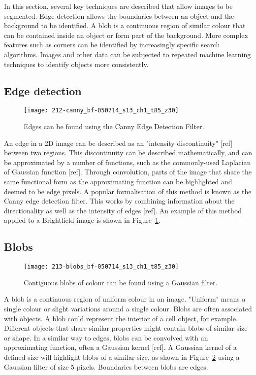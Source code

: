 In this section, several key techniques are described that allow images to be segmented. Edge detection allows the boundaries between an object and the background to be identified. A blob is a continuous region of similar colour that can be contained inside an object or form part of the background. More complex features such as corners can be identified by increasingly specific search algorithms. Images and other data can be subjected to repeated machine learning techniques to identify objects more consistently.

\subsection{Edge detection}

\begin{figure}[htbp!]
\centering
\texttt{[image: 212-canny\_bf-050714\_s13\_ch1\_t85\_z30]}
\caption[The canny filter]{Edges can be found using the Canny Edge Detection Filter.}
\label{fig:canny_filter_bf}
\end{figure}

An edge in a 2D image can be described as an "intensity discontinuity" [ref] between two regions. This discontinuity can be described mathematically, and can be approximated by a number of functions, such as the commonly-used Laplacian of Gaussian function [ref]. Through convolution, parts of the image that share the same functional form as the approximating function can be highlighted and deemed to be edge pixels. A popular formalisation of this method is known as the Canny edge detection filter. This works by combining information about the directionality as well as the intensity of edges [ref]. An example of this method applied to a Brightfield image is shown in Figure~\ref{fig:canny_filter_bf}.

\subsection{Blobs}

\begin{figure}[htbp!]
\centering
\texttt{[image: 213-blobs\_bf-050714\_s13\_ch1\_t85\_z30]}
\caption[Blob detection]{Contiguous blobs of colour can be found using a Gaussian filter.}
\label{fig:blob_detection_bf}
\end{figure}

A blob is a continuous region of uniform colour in an image. "Uniform" means a single colour or slight variations around a single colour. Blobs are often associated with objects. A blob could represent the interior of a cell object, for example. Different objects that share similar properties might contain blobs of similar size or shape. In a similar way to edges, blobs can be convolved with an approximating function, often a Gaussian kernel [ref]. A Gaussian kernel of a defined size will highlight blobs of a similar size, as shown in Figure~\ref{fig:blob_detection_bf} using a Gaussian filter of size 5 pixels. Boundaries between blobs are edges.

